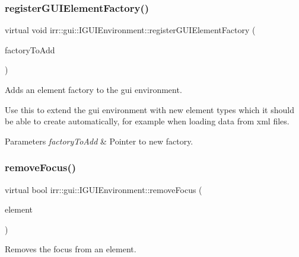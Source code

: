 \subsubsection{\texorpdfstring{register\+G\+U\+I\+Element\+Factory()}{registerGUIElementFactory()}}
{\footnotesize\ttfamily virtual void irr\+::gui\+::\+I\+G\+U\+I\+Environment\+::register\+G\+U\+I\+Element\+Factory (\begin{DoxyParamCaption}\item[{\hyperlink{classirr_1_1gui_1_1IGUIElementFactory}{I\+G\+U\+I\+Element\+Factory} $\ast$}]{factory\+To\+Add }\end{DoxyParamCaption})\hspace{0.3cm}{\ttfamily [pure virtual]}}



Adds an element factory to the gui environment. 

Use this to extend the gui environment with new element types which it should be able to create automatically, for example when loading data from xml files. 
\begin{DoxyParams}{Parameters}
{\em factory\+To\+Add} & Pointer to new factory. \\
\hline
\end{DoxyParams}
\mbox{\label{classirr_1_1gui_1_1IGUIEnvironment_ab2100753b415a9950d95572d4623bf46}} 
\subsubsection{\texorpdfstring{remove\+Focus()}{removeFocus()}}
{\footnotesize\ttfamily virtual bool irr\+::gui\+::\+I\+G\+U\+I\+Environment\+::remove\+Focus (\begin{DoxyParamCaption}\item[{\hyperlink{classirr_1_1gui_1_1IGUIElement}{I\+G\+U\+I\+Element} $\ast$}]{element }\end{DoxyParamCaption})\hspace{0.3cm}{\ttfamily [pure virtual]}}



Removes the focus from an element. 

